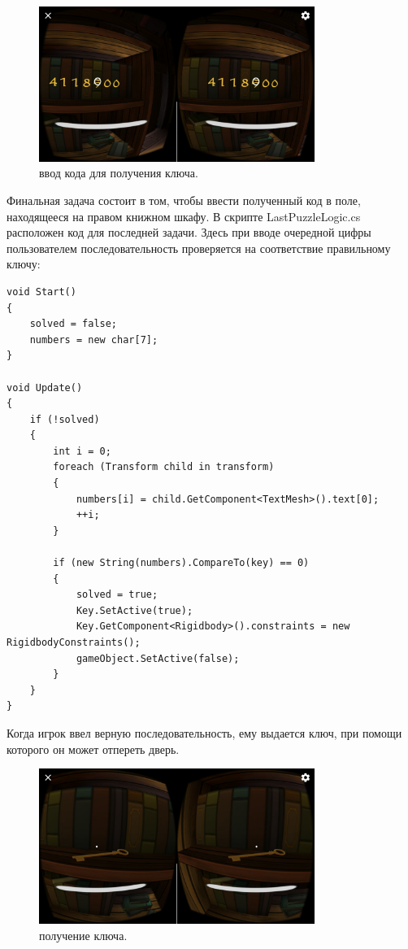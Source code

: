 \begin{figure}[h!]
    \centering
    \includegraphics[width=0.8\textwidth]{./screenshots/last_code.jpg}
    \caption{\small{ввод кода для получения ключа.}}
    \label{last_code}
\end{figure} 

\newpage
Финальная задача состоит в том, чтобы ввести полученный код в поле, находящееся на правом книжном шкафу. 
В скрипте LastPuzzleLogic.cs расположен код для последней задачи. Здесь при вводе очередной цифры пользователем последовательность проверяется на соответствие правильному ключу:

\begin{small}
    \begin{verbatim}
void Start()
{
    solved = false;
    numbers = new char[7];
}

void Update()
{
    if (!solved)
    {
        int i = 0;
        foreach (Transform child in transform)
        {
            numbers[i] = child.GetComponent<TextMesh>().text[0];
            ++i;
        }
        
        if (new String(numbers).CompareTo(key) == 0)
        {
            solved = true;
            Key.SetActive(true);
            Key.GetComponent<Rigidbody>().constraints = new RigidbodyConstraints();
            gameObject.SetActive(false);
        }
    }
}
    \end{verbatim}
\end{small}

Когда игрок ввел верную последовательность, ему выдается ключ, при помощи которого он может отпереть дверь.


\begin{figure}[h!]
    \centering
    \includegraphics[width=0.8\textwidth]{./screenshots/found_key.jpg}
    \caption{\small{получение ключа.}}
    \label{found_key}
\end{figure} 

